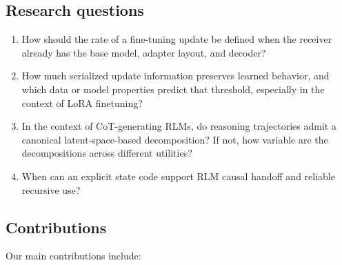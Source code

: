 \subsection{Research questions}

\begin{enumerate}[leftmargin=*]
    \item How should the rate of a fine-tuning update be defined when the receiver already has the base model, adapter layout, and decoder?
    \item How much serialized update information preserves learned behavior, and which data or model properties predict that threshold, especially in the context of LoRA finetuning?
    \item In the context of CoT-generating RLMs, do reasoning trajectories admit a canonical latent-space-based decomposition? If not, how variable are the decompositions across different utilities?
    \item When can an explicit state code support RLM causal handoff and reliable recursive use?
\end{enumerate}

\subsection{Contributions}

Our main contributions include:


